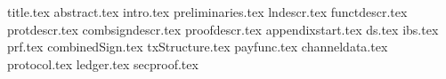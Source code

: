 \documentclass{llncs}
\begin{document}
\pagestyle{plain}
{title.tex}
{abstract.tex}
{intro.tex}
{preliminaries.tex}
{lndescr.tex}
{functdescr.tex}
{protdescr.tex}
{combsigndescr.tex}
{proofdescr.tex}
{appendixstart.tex}
{ds.tex}
{ibs.tex}
{prf.tex}
{combinedSign.tex}
{txStructure.tex}
{payfunc.tex}
{channeldata.tex}
{protocol.tex}
{ledger.tex}
{secproof.tex}


\end{document}
